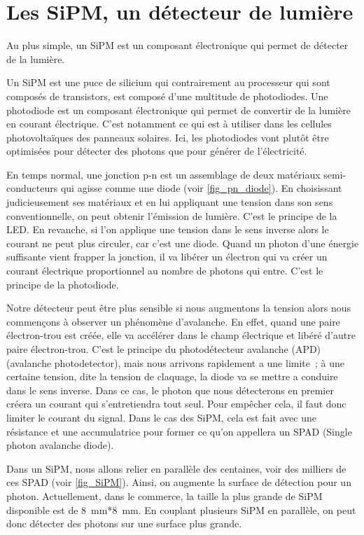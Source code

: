 \section{Les SiPM, un détecteur de lumière}
Au plus simple, un SiPM est un composant électronique qui permet de détecter de la lumière.

Un SiPM est une puce de silicium qui contrairement au processeur qui sont composés de transistors, est composé d'une multitude de photodiodes. Une photodiode est un composant électronique qui permet de convertir de la lumière en courant électrique. C'est notamment ce qui est à utiliser dans les cellules photovoltaïques des panneaux solaires. Ici, les photodiodes vont plutôt être optimisées pour détecter des photons que pour générer de l'électricité. 

En temps normal, une jonction p-n est un assemblage de deux matériaux semi-conducteurs qui agisse comme une diode (voir \cref{fig_pn_diode}). En choisissant judicieusement ses matériaux et en lui appliquant une tension dans son sens conventionnelle, on peut obtenir l'émission de lumière. C'est le principe de la LED. En revanche, si l’on applique une tension dans le sens inverse alors le courant ne peut plus circuler, car c'est une diode. Quand un photon d'une énergie suffisante vient frapper la jonction, il va libérer un électron qui va créer un courant électrique proportionnel au nombre de photons qui entre. C'est le principe de la photodiode.

Notre détecteur peut être plus sensible si nous augmentons la tension alors nous commençons à observer un phénomène d'avalanche. En effet, quand une paire électron-trou est créée, elle va accélérer dans le champ électrique et libéré d'autre paire électron-trou. C'est le principe du photodétecteur avalanche (APD)
(avalanche photodetector), mais nous arrivons rapidement a une limite~; à une certaine tension, dite la tension de claquage, la diode va se mettre a conduire dans le sens inverse. Dans ce cas, le photon que nous détecterons en premier créera un courant qui s'entretiendra tout seul. Pour empêcher cela, il faut donc limiter le courant du signal. Dans le cas des SiPM, cela est fait avec une résistance et une accumulatrice pour former ce qu'on appellera un SPAD (Single photon avalanche diode).

Dans un SiPM, nous allons relier en parallèle des centaines, voir des milliers de ces SPAD (voir \cref{fig_SiPM}). Ainsi, on augmente la surface de détection pour un photon. Actuellement, dans le commerce, la taille la plus grande de SiPM disponible est de 8~mm*8~mm\cite{}. En couplant plusieurs SiPM en parallèle, on peut donc détecter des photons sur une surface plus grande.

